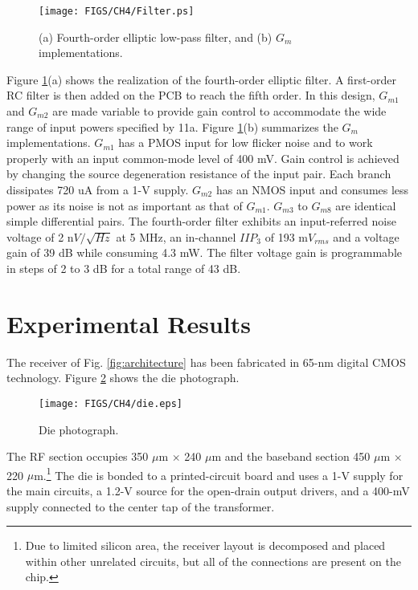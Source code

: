 \begin{figure}[htb!]
\centering
\texttt{[image: FIGS/CH4/Filter.ps]}
\caption{(a) Fourth-order elliptic low-pass filter, and (b) $G_m$ implementations.}
\label{fig:filter}
\end{figure}
Figure \ref{fig:filter}(a) shows the realization of the fourth-order elliptic filter.  A first-order RC filter is then added on the PCB to reach the
fifth order. In this design, $G_{m1}$ and $G_{m2}$ are made variable to provide gain control to accommodate the wide range of input powers specified
by 11a. Figure \ref{fig:filter}(b) summarizes the $G_m$ implementations. $G_{m1}$ has a PMOS input for low flicker noise and to work
properly with an input common-mode level of 400 mV. Gain control is achieved by changing the source degeneration resistance of the input pair. Each
branch dissipates 720 uA from a 1-V supply.  $G_{m2}$ has an NMOS input and consumes less power as its noise is not as important as that of
$G_{m1}$. $G_{m3}$ to $G_{m8}$ are identical simple differential pairs.  The fourth-order filter exhibits an input-referred noise voltage of 2
n${V}/\sqrt{Hz}$ at 5 MHz, an in-channel $IIP_3$ of 193 m${V}_{rms}$ and a voltage gain of 39 dB while consuming 4.3 mW. The filter
voltage gain is programmable in steps of 2 to 3 dB for a total range of 43 dB.


\section{Experimental Results}
The receiver of Fig. \ref{fig:architecture} has been fabricated in 65-nm digital CMOS technology. Figure \ref{fig:die} shows the die photograph.
\begin{figure}[htb!]
\centering
\texttt{[image: FIGS/CH4/die.eps]}
\caption{Die photograph.}
\label{fig:die}
\end{figure}
The RF section occupies 350 $\mu$m $\times$ 240 $\mu$m and the baseband section 450 $\mu$m $\times$ 220 $\mu$m.\footnote{Due to limited silicon area,
the receiver layout is decomposed and placed within other unrelated circuits, but all of the connections are present on the chip.}
The die is bonded to a printed-circuit board and uses a 1-V supply for the main circuits, a 1.2-V source for the open-drain output drivers, and a
400-mV supply connected to the center tap of the transformer.



